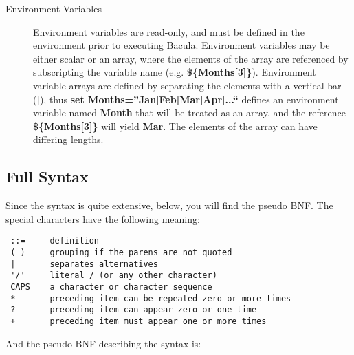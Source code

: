 \begin{description}
\item [Environment Variables]
   Environment variables are read-only,  and must be defined in the environment
prior to executing Bacula.  Environment variables may be either scalar or an
array, where the  elements of the array are referenced by subscripting the
variable  name (e.g. {\bf \$\{Months[3]\}}). Environment variable arrays are 
defined by separating the elements with a vertical bar ({\bf |}),  thus {\bf
set Months=''Jan|Feb|Mar|Apr|...``} defines  an environment variable named
{\bf Month} that will be  treated as an array, and the reference {\bf
\$\{Months[3]\}} will  yield {\bf Mar}. The elements of the array can have 
differing lengths. 
\end{description}

\subsection*{Full Syntax}

Since the syntax is quite extensive, below, you will find the pseudo BNF. The
special characters have the following meaning: 

\footnotesize
\begin{verbatim}
 ::=     definition
 ( )     grouping if the parens are not quoted
 |       separates alternatives
 '/'     literal / (or any other character)
 CAPS    a character or character sequence
 *       preceding item can be repeated zero or more times
 ?       preceding item can appear zero or one time
 +       preceding item must appear one or more times
\end{verbatim}
\normalsize

And the pseudo BNF describing the syntax is: 

